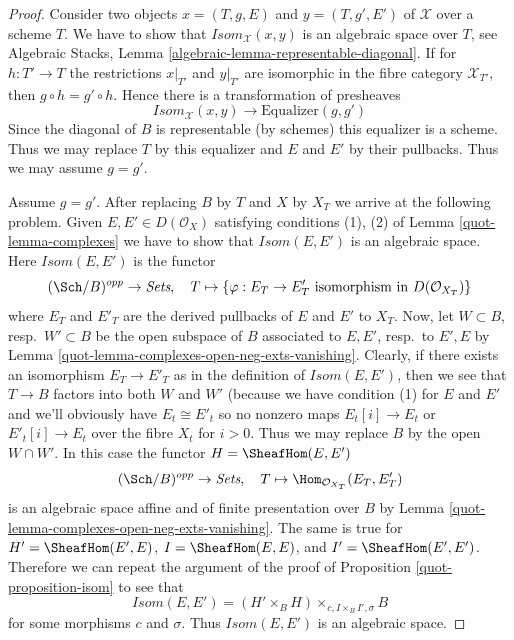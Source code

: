\begin{proof}

Consider two objects $x = (T, g, E)$ and $y = (T, g', E')$
of $\mathcal{X}$ over a scheme $T$. We have to show that
$\mathit{Isom}_\mathcal{X}(x, y)$ is an algebraic space over $T$, see
Algebraic Stacks, Lemma \ref{algebraic-lemma-representable-diagonal}.
If for $h : T' \to T$ the restrictions $x|_{T'}$ and $y|_{T'}$ are isomorphic
in the fibre category $\mathcal{X}_{T'}$, then $g \circ h = g' \circ h$.
Hence there is a transformation of presheaves
$$
\mathit{Isom}_\mathcal{X}(x, y) \longrightarrow \text{Equalizer}(g, g')
$$
Since the diagonal of $B$ is representable (by schemes) this equalizer is
a scheme. Thus we may replace $T$ by this equalizer and
$E$ and $E'$ by their pullbacks. Thus we may assume $g = g'$.

\medskip\noindent
Assume $g = g'$. After replacing $B$ by $T$ and $X$ by $X_T$ we arrive
at the following problem. Given $E, E' \in D(\mathcal{O}_X)$
satisfying conditions (1), (2) of Lemma \ref{quot-lemma-complexes}
we have to show that $\mathit{Isom}(E, E')$ is an algebraic space.
Here $\mathit{Isom}(E, E')$ is the functor
$$
(\Sch/B)^{opp} \to \textit{Sets},\quad
T \mapsto \{\varphi : E_T \to E'_T
\text{ isomorphism in }D(\mathcal{O}_{X_T})\}
$$
where $E_T$ and $E'_T$ are the derived pullbacks of $E$ and $E'$
to $X_T$. Now, let $W \subset B$, resp.\ $W' \subset B$ be the
open subspace of $B$ associated
to $E, E'$, resp.\ to $E', E$ by
Lemma \ref{quot-lemma-complexes-open-neg-exts-vanishing}.
Clearly, if there exists an isomorphism $E_T \to E'_T$ as in
the definition of $\mathit{Isom}(E, E')$, then we see that
$T \to B$ factors into both $W$ and $W'$ (because we have
condition (1) for $E$ and $E'$ and we'll obviously have
$E_t \cong E'_t$ so no nonzero maps $E_t[i] \to E_t$
or $E'_t[i] \to E_t$ over the fibre $X_t$ for $i > 0$.
Thus we may replace $B$ by the open $W \cap W'$.
In this case the functor $H = \SheafHom(E, E')$
$$
(\Sch/B)^{opp} \to \textit{Sets},\quad T \mapsto
\Hom_{\mathcal{O}_{X_T}}(E_T, E'_T)
$$
is an algebraic space affine and of finite presentation over $B$ by
Lemma \ref{quot-lemma-complexes-open-neg-exts-vanishing}.
The same is true for
$H' = \SheafHom(E', E)$,
$I = \SheafHom(E, E)$, and
$I' = \SheafHom(E', E')$.
Therefore we can repeat the argument of the proof of
Proposition \ref{quot-proposition-isom} to see that
$$
\mathit{Isom}(E, E') = (H' \times_B H) \times_{c, I \times_B I', \sigma} B
$$
for some morphisms $c$ and $\sigma$. Thus
$\mathit{Isom}(E, E')$ is an algebraic space.
\end{proof}

